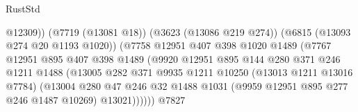\begin{lexlean}{RustStd}
\begin{coremodule}
                                                    @12309))
                                                (@7719 (@13081 @18))
                                                (@3623 (@13086 @219 @274))
                                                (@6815 (@13093 @274 @20 @1193 @1020))
                                                (@7758
                                                  @12951
                                                  @407
                                                  @398
                                                  @1020
                                                  @1489
                                                  (@7767
                                                    @12951
                                                    @895
                                                    @407
                                                    @398
                                                    @1489
                                                    (@9920
                                                      @12951
                                                      @895
                                                      @144
                                                      @280
                                                      @371
                                                      @246
                                                      @1211
                                                      @1488
                                                      (@13005
                                                        @282
                                                        @371
                                                        @9935
                                                        @1211
                                                        @10250
                                                        (@13013 @1211 @13016 @7784)
                                                        (@13004
                                                          @280
                                                          @47
                                                          @246
                                                          @32
                                                          @1488
                                                          @1031
                                                          (@9959 @12951 @895 @277 @246 @1487 @10269)
                                                          @13021))))))
                                              @7827

\end{coremodule}
\end{lexlean}
